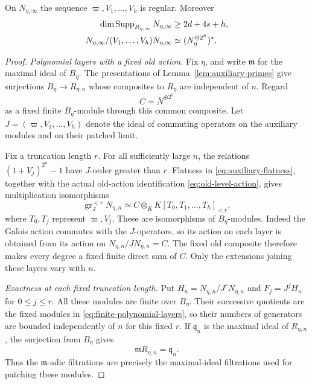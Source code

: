 \begin{proposition}
\label{prop:patched-regular-sequence}
On $N_{\eta,\infty}$ the sequence
$\varpi,V_1,\ldots,V_h$ is regular.  Moreover
\begin{align}
 \dim\operatorname{Supp}_{R_{\eta,\infty}}N_{\eta,\infty}
       &\geq2d+4s+h,                                  \label{eq:patched-dimension}\\
 N_{\eta,\infty}/(V_1,\ldots,V_h)N_{\eta,\infty}
       &\simeq (N_\eta^{\oplus2^h})^*.                \label{eq:patched-augmentation}
\end{align}
\end{proposition}

\begin{proof}
\emph{Polynomial layers with a fixed old action.}
Fix $\eta$, and write $\mathfrak m$ for the maximal ideal of
$B_\eta$. The presentations of Lemma~\ref{lem:auxiliary-primes}
give surjections $B_\eta\to R_{\eta,n}$ whose composites to
$R_\eta$ are independent of $n$. Regard
\[
 C=\overline N^{\oplus2^h}
\]
as a fixed finite $B_\eta$-module through this common composite.
Let $J=(\varpi,V_1,\ldots,V_h)$ denote the ideal of commuting
operators on the auxiliary modules and on their patched limit.

Fix a truncation length $r$. For all sufficiently large $n$, the
relations $(1+V_j)^{2^n}-1$ have $J$-order greater than $r$.
Flatness in \eqref{eq:auxiliary-flatness}, together with the actual
old-action identification \eqref{eq:old-level-action}, gives
multiplication isomorphisms
\begin{equation}\label{eq:finite-polynomial-layers}
 \operatorname{gr}_J^{<r} N_{\eta,n}
   \simeq C\otimes_K K[T_0,T_1,\ldots,T_h]_{<r},
\end{equation}
where $T_0,T_j$ represent $\varpi,V_j$. These are isomorphisms of
$B_\eta$-modules. Indeed the Galois action commutes with the
$J$-operators, so its action on each layer is obtained from its
action on $N_{\eta,n}/JN_{\eta,n}=C$. The fixed old composite
therefore makes every degree a fixed finite direct sum of $C$.
Only the extensions joining these layers vary with $n$.

\emph{Exactness at each fixed truncation length.}
Put $H_n=N_{\eta,n}/J^rN_{\eta,n}$ and
$F_j=J^jH_n$ for $0\leq j\leq r$. All these modules are finite
over $B_\eta$. Their successive quotients are the fixed modules
in \eqref{eq:finite-polynomial-layers}, so their numbers of
generators are bounded independently of $n$ for this fixed $r$.
If $\mathfrak q_n$ is the maximal ideal of $R_{\eta,n}$, the
surjection from $B_\eta$ gives
\[
 \mathfrak m R_{\eta,n}=\mathfrak q_n.
\]
Thus the $\mathfrak m$-adic filtrations are precisely the
maximal-ideal filtrations used for patching these modules.


\end{proof}
